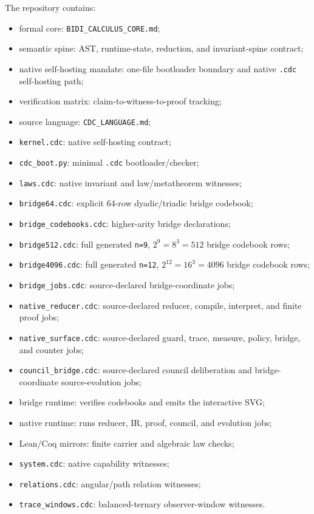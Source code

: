 \documentclass[11pt]{article}
\begin{document}
The repository contains:
\begin{itemize}
\item formal core: \nolinkurl{BIDI_CALCULUS_CORE.md};
\item semantic spine: AST, runtime-state, reduction, and invariant-spine contract;
\item native self-hosting mandate: one-file bootloader boundary and native
\texttt{.cdc} self-hosting path;
\item verification matrix: claim-to-witness-to-proof tracking;
\item source language: \nolinkurl{CDC_LANGUAGE.md};
\item \texttt{kernel.cdc}: native self-hosting contract;
\item \texttt{cdc\_boot.py}: minimal \texttt{.cdc} bootloader/checker;
\item \texttt{laws.cdc}: native invariant and law/metatheorem witnesses;
\item \texttt{bridge64.cdc}: explicit 64-row dyadic/triadic bridge codebook;
\item \texttt{bridge\_codebooks.cdc}: higher-arity bridge declarations;
\item \texttt{bridge512.cdc}: full generated \texttt{n=9}, $2^9=8^3=512$ bridge codebook rows;
\item \texttt{bridge4096.cdc}: full generated \texttt{n=12}, $2^{12}=16^3=4096$ bridge codebook rows;
\item \texttt{bridge\_jobs.cdc}: source-declared bridge-coordinate jobs;
\item \texttt{native\_reducer.cdc}: source-declared reducer, compile, interpret, and finite proof jobs;
\item \texttt{native\_surface.cdc}: source-declared guard, trace, measure, policy, bridge, and counter jobs;
\item \texttt{council\_bridge.cdc}: source-declared council deliberation and bridge-coordinate source-evolution jobs;
\item bridge runtime: verifies codebooks and emits the interactive SVG;
\item native runtime: runs reducer, IR, proof, council, and evolution jobs;
\item Lean/Coq mirrors: finite carrier and algebraic law checks;
\item \texttt{system.cdc}: native capability witnesses;
\item \texttt{relations.cdc}: angular/path relation witnesses;
\item \texttt{trace\_windows.cdc}: balanced-ternary observer-window witnesses.
\end{itemize}
\end{document}
